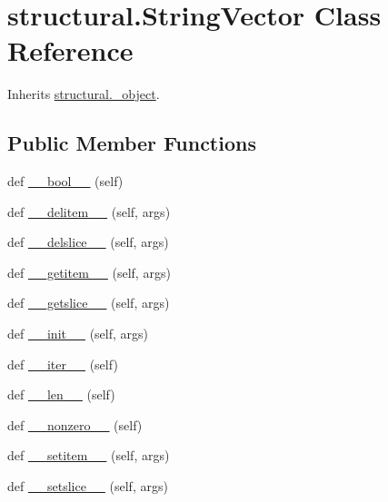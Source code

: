 \hypertarget{classstructural_1_1_string_vector}{}\section{structural.\+String\+Vector Class Reference}
\label{classstructural_1_1_string_vector}


Inherits \hyperlink{classstructural_1_1__object}{structural.\+\_\+object}.

\subsection*{Public Member Functions}
\begin{DoxyCompactItemize}
\item 
def \hyperlink{classstructural_1_1_string_vector_a2625c12fc6f916193219b42a1a974dfb}{\+\_\+\+\_\+bool\+\_\+\+\_\+} (self)
\item 
def \hyperlink{classstructural_1_1_string_vector_ac48b3361cf482a11281b5d0aa9e23c5f}{\+\_\+\+\_\+delitem\+\_\+\+\_\+} (self, args)
\item 
def \hyperlink{classstructural_1_1_string_vector_a90a801d8ce6800193cfcf0bbde11c1f0}{\+\_\+\+\_\+delslice\+\_\+\+\_\+} (self, args)
\item 
def \hyperlink{classstructural_1_1_string_vector_a80550bf99ad0a463c682ab52c79191db}{\+\_\+\+\_\+getitem\+\_\+\+\_\+} (self, args)
\item 
def \hyperlink{classstructural_1_1_string_vector_a7bdee0b1f59eed72b413e9d0a444c774}{\+\_\+\+\_\+getslice\+\_\+\+\_\+} (self, args)
\item 
def \hyperlink{classstructural_1_1_string_vector_af7de40a38181ab9f228cb209cd38fe30}{\+\_\+\+\_\+init\+\_\+\+\_\+} (self, args)
\item 
def \hyperlink{classstructural_1_1_string_vector_ac13395ed918f49e1e87f3e2ec9a01b19}{\+\_\+\+\_\+iter\+\_\+\+\_\+} (self)
\item 
def \hyperlink{classstructural_1_1_string_vector_a57f98914de74e97e161238333a1a3127}{\+\_\+\+\_\+len\+\_\+\+\_\+} (self)
\item 
def \hyperlink{classstructural_1_1_string_vector_a2ca6140f5b6627f018efc258e501cc9f}{\+\_\+\+\_\+nonzero\+\_\+\+\_\+} (self)
\item 
def \hyperlink{classstructural_1_1_string_vector_ae5c2aff913b00eaff32dd44b8fd814a6}{\+\_\+\+\_\+setitem\+\_\+\+\_\+} (self, args)
\item 
def \hyperlink{classstructural_1_1_string_vector_a0c5ea15e24106501cbae3d88f52d1459}{\+\_\+\+\_\+setslice\+\_\+\+\_\+} (self, args)

\end{DoxyCompactItemize}
